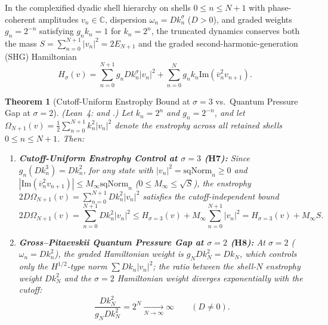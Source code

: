 \documentclass[11pt,a4paper]{article}
\newtheorem{theorem}{Theorem}[section]
\theoremstyle{definition}
\theoremstyle{remark}
\begin{document}
In the complexified dyadic shell hierarchy on shells $0 \le n \le N+1$ with phase-coherent amplitudes $v_n \in \mathbb{C}$, dispersion $\omega_n = D k_n^\sigma$ ($D > 0$), and graded weights $g_n = 2^{-n}$ satisfying $g_n k_n = 1$ for $k_n = 2^n$, the truncated dynamics conserves both the mass $S = \sum_{n=0}^{N+1} |v_n|^2 = 2E_{N+1}$ and the graded second-harmonic-generation (SHG) Hamiltonian
\begin{equation}\label{eq:shg_ham}
H_\sigma(v) = \sum_{n=0}^{N+1} g_n D k_n^\sigma |v_n|^2 + \sum_{n=0}^{N} g_n k_n \mathrm{Im}\!\left(\overline{v}_n^2 v_{n+1}\right).
\end{equation}

\begin{theorem}[Cutoff-Uniform Enstrophy Bound at $\sigma = 3$ vs.\ Quantum Pressure Gap at $\sigma = 2$]\label{thm:sigma_rule}
\emph{(Lean~4:  and .)} Let $k_n = 2^n$ and $g_n = 2^{-n}$, and let $\Omega_{N+1}(v) = \frac{1}{2}\sum_{n=0}^{N+1} k_n^2 |v_n|^2$ denote the enstrophy across all retained shells $0 \le n \le N+1$. Then:
\begin{enumerate}
\item \textbf{Cutoff-Uniform Enstrophy Control at $\sigma = 3$ ($\mathbf{H7}$):} Since $g_n (D k_n^3) = D k_n^2$, for any state with $|v_n|^2 = \mathrm{sqNorm}_n \ge 0$ and $|\mathrm{Im}(\overline{v}_n^2 v_{n+1})| \le M_\infty \mathrm{sqNorm}_n$ ($0 \le M_\infty \le \sqrt{S}$), the enstrophy $2D\Omega_{N+1}(v) = \sum_{n=0}^{N+1} D k_n^2 |v_n|^2$ satisfies the cutoff-independent bound
\begin{equation}\label{eq:sigma3_bound}
2D\Omega_{N+1}(v) = \sum_{n=0}^{N+1} D k_n^2 |v_n|^2 \le H_{\sigma=3}(v) + M_\infty \sum_{n=0}^{N+1} |v_n|^2 = H_{\sigma=3}(v) + M_\infty S.
\end{equation}
\item \textbf{Gross--Pitaevskii Quantum Pressure Gap at $\sigma = 2$ ($\mathbf{H8}$):} At $\sigma = 2$ ($\omega_n = D k_n^2$), the graded Hamiltonian weight is $g_N D k_N^2 = D k_N$, which controls only the $H^{1/2}$-type norm $\sum D k_n |v_n|^2$; the ratio between the shell-$N$ enstrophy weight $D k_N^2$ and the $\sigma=2$ Hamiltonian weight diverges exponentially with the cutoff:
\begin{equation}\label{eq:sigma2_gap}
\frac{D k_N^2}{g_N D k_N^2} = 2^N \xrightarrow[N\to\infty]{} \infty \qquad (D \ne 0).
\end{equation}
\end{enumerate}
\end{theorem}
\end{document}
